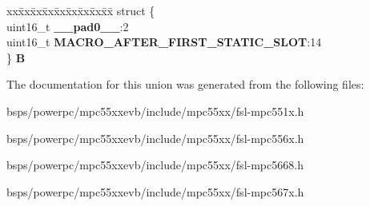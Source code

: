 \begin{DoxyCompactItemize}
\begin{tabbing}
\end{tabbing}\item 
\mbox{\label{unionuPCR1_a6ed5700678916b7a797a13bda3b39c64}} 
\begin{tabbing}
xx\=xx\=xx\=xx\=xx\=xx\=xx\=xx\=xx\=\kill
struct \{\\
\>uint16\_t {\bfseries \_\_pad0\_\_}:2\\
\>uint16\_t {\bfseries MACRO\_AFTER\_FIRST\_STATIC\_SLOT}:14\\
\} {\bfseries B}\\

\end{tabbing}\end{DoxyCompactItemize}


The documentation for this union was generated from the following files\+:\begin{DoxyCompactItemize}
\item 
bsps/powerpc/mpc55xxevb/include/mpc55xx/fsl-\/mpc551x.\+h\item 
bsps/powerpc/mpc55xxevb/include/mpc55xx/fsl-\/mpc556x.\+h\item 
bsps/powerpc/mpc55xxevb/include/mpc55xx/fsl-\/mpc5668.\+h\item 
bsps/powerpc/mpc55xxevb/include/mpc55xx/fsl-\/mpc567x.\+h\end{DoxyCompactItemize}
